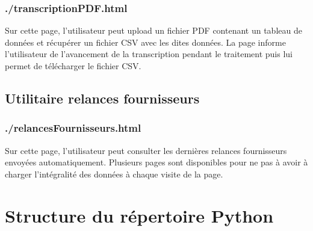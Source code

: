 \subsection{./transcriptionPDF.html}

Sur cette page, l’utilisateur peut upload un fichier PDF contenant un tableau de données et récupérer un fichier CSV avec les dites données. La page informe l’utilisateur de l’avancement de la transcription pendant le traitement puis lui permet de télécharger le fichier CSV.

\section{Utilitaire relances fournisseurs}

\subsection{./relancesFournisseurs.html}

Sur cette page, l’utilisateur peut consulter les dernières relances fournisseurs envoyées automatiquement. Plusieurs pages sont disponibles pour ne pas à avoir à charger l’intégralité des données à chaque visite de la page.


\chapter{Structure du répertoire Python}


